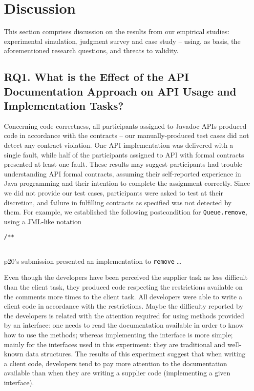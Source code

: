 \section{Discussion}
\label{discussion}

This section comprises discussion on the results from our empirical studies: experimental simulation, judgment survey and case study -- using, as basis, the aforementioned research questions, and threats to validity.


\subsection{RQ1. What is the Effect of the API Documentation Approach on API Usage and Implementation Tasks?}
\label{rq1}

Concerning code correctness, all participants assigned to Javadoc APIs produced code
in accordance with the contracts -- our manually-produced test cases did not detect any contract violation. One \contractjdoc{} API implementation was delivered with a single fault, while half of the participants assigned to API with formal contracts presented at least one fault.
These results may suggest participants had trouble understanding API formal contracts, assuming their self-reported experience in Java programming and their intention to complete the assignment correctly.
Since we did not provide our test cases, participants were asked to test at their discretion, and failure in fulfilling contracts as specified was not detected by them.
For example, we established the following postcondition for \texttt{Queue.remove}, using a JML-like notation
\begin{lstlisting}[basicstyle=\footnotesize\ttfamily,name=figxpi, frame=lines, mathescape=true]
/**
   
\end{lstlisting}
p20's submission presented an implementation to \texttt{remove} \ldots 







Even though the developers have been perceived the supplier task as less
difficult than the client task, they produced code respecting the restrictions
available on the comments more times to the client task. All developers were
able to write a client code in accordance with the restrictions. Maybe the
difficulty reported by the developers is related with the attention required for
using methods provided by an interface: one needs to read the documentation
available in order to know how to use the methods; whereas implementing the
interface is more simple; mainly for the interfaces used in this experiment:
they are traditional and well-known data structures.
The results of this experiment suggest that when writing a client code,
developers tend to pay more attention to the documentation available than when
they are writing a supplier code (implementing a given interface).




